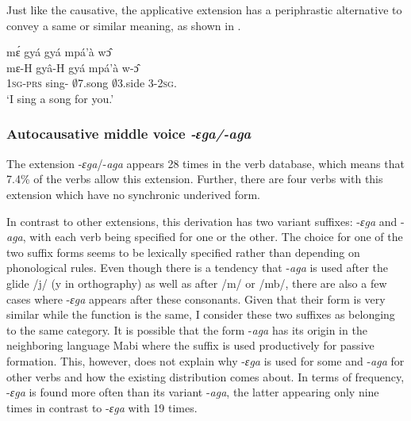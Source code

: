 Just like the causative,  the applicative extension has a periphrastic alternative to convey a same or similar meaning, as shown in .

\ea \label{APPperi}
  \glll     mɛ́ gyá gyá mpá'à wɔ̂ \\
	mɛ-H gyâ-H gyá mpá'à w-ɔ̂ \\
    1\textsc{sg}-\textsc{prs} sing-{\R} $\emptyset$7.song $\emptyset$3.side 3-2\textsc{sg}.{\POSS}   \\
    \trans `I sing a song for you.'
\z

\subsubsection{Autocausative middle voice \textit{-ɛga/-aga}}
\label{sec:AutoCaus}

The extension -{\itshape ɛga}/-{\itshape aga} appears 28 times in the verb database, which means that 7.4\% of the verbs allow this extension. Further, there are four verbs with this extension which have no synchronic underived form. 

In contrast to other extensions, this derivation has two variant suffixes: -{\itshape ɛga} and -{\itshape aga}, with each verb being specified for one or the other. The choice for one of the two suffix forms seems to be lexically specified rather than depending on phonological rules. Even though there is a tendency that -{\itshape aga} is used after the glide /j/ ({\textlangle}y{\textrangle}  in orthography) as well as after /m/ or /mb/, there are also a few cases where -{\itshape ɛga} appears after these consonants. Given that their form is very similar while the function is the same, I consider these two suffixes as belonging to the same category.  It is possible that the form -{\itshape aga} has its origin in the neighboring language Mabi where the suffix is used productively for passive formation. This, however, does not explain why -{\itshape ɛga} is used for some and -{\itshape aga} for other verbs and how the existing distribution comes about. In terms of frequency, -{\itshape ɛga} is found more often than its variant -{\itshape aga}, the latter appearing only nine times in contrast to -{\itshape ɛga} with 19 times.

